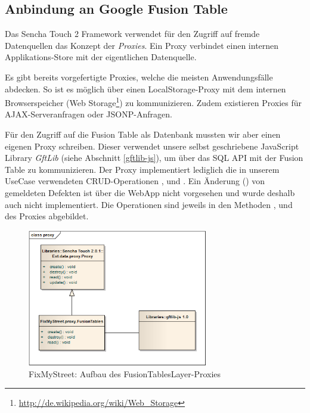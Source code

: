 \subsection{Anbindung an Google Fusion Table}
\label{fixmystreet-proxy}
Das Sencha Touch 2 Framework verwendet für den Zugriff auf fremde Datenquellen das Konzept der \emph{Proxies}. Ein Proxy verbindet einen internen Applikations-Store mit der eigentlichen Datenquelle.

Es gibt bereits vorgefertigte Proxies, welche die meisten Anwendungsfälle abdecken. So ist es möglich über einen LocalStorage-Proxy mit dem internen Browserspeicher (Web Storage\footnote{\url{http://de.wikipedia.org/wiki/Web_Storage}}) zu kommunizieren. Zudem existieren Proxies für \gls{AJAX}-Serveranfragen oder \gls{JSONP}-Anfragen.

Für den Zugriff auf die Fusion Table als Datenbank mussten wir aber einen eigenen Proxy schreiben. Dieser verwendet unsere selbst geschriebene JavaScript Library \emph{GftLib} (siehe Abschnitt \ref{gftlib-js}), um über das SQL \gls{API} mit der Fusion Table zu kommunizieren.
Der Proxy implementiert lediglich die in unserem UseCase verwendeten CRUD-Operationen ,  und . Ein Änderung () von gemeldeten Defekten ist über die \gls{WebApp} nicht vorgesehen und wurde deshalb auch nicht implementiert.
Die Operationen sind jeweils in den Methoden ,  und  des Proxies abgebildet.

\begin{figure}[H]
	\centering
	\includegraphics[width=0.7\textwidth]{images/usecase2-fixmystreet/uml/fixmystreet-proxy-classmodel}
	\caption{FixMyStreet: Aufbau des FusionTablesLayer-Proxies}
	\label{fixmystreet-proxy-classmodel}
\end{figure}

